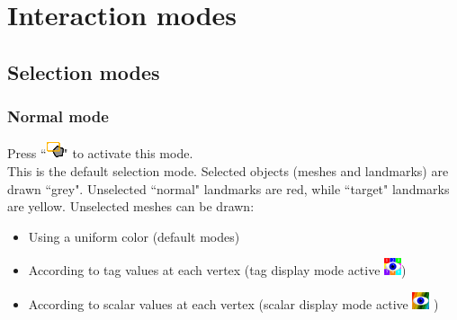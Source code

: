 \chapter{Interaction modes}
\minitoc  

 \section{Selection modes}
 \subsection{Normal mode}
Press ``\includegraphics[scale=0.7]{images/pixmap/Normal_select_mode.png}" to activate this mode.\\
This is the default selection mode. Selected objects (meshes and landmarks) are drawn ``grey". Unselected ``normal" landmarks are red, while ``target" landmarks are yellow. Unselected meshes can be drawn:
\begin{itemize}
\item Using a uniform color (default modes)
\item According to tag values at each vertex (tag display mode active \includegraphics[scale=0.7]{images/pixmap/Show_Tag_Window.png})
\item	According to scalar values at each vertex (scalar display mode active \includegraphics[scale=0.7]{images/pixmap/show_color_scale.png} )
\end{itemize}



